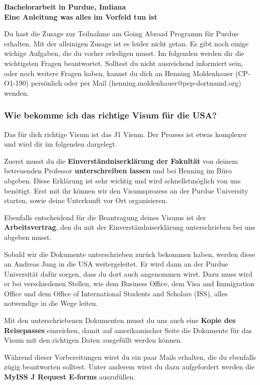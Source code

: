 \documentclass[
  paper=a4,
  fontsize=12pt,
  DIV=16,
  headheight=52pt,
  footheight=45pt,
  headinclude,
  parskip=full,
]{scrartcl}
\date{10. October 2017}
\begin{document}
\textbf{\Huge\sffamily Bachelorarbeit in Purdue, Indiana}\\[0.5\baselineskip]
\textbf{\Large\sffamily Eine Anleitung was alles im Vorfeld tun ist}

Du hast die Zusage zur Teilnahme am Going Abroad Programm für Purdue erhalten.
Mit der alleinigen Zusage ist es leider nicht getan.
Es gibt noch einige wichige Aufgaben, die du vorher erledigen musst.
Im folgenden werden dir die wichtigsten Fragen beantwortet.
Solltest du nicht ausreichend informiert sein, oder noch weitere Fragen haben,
kannst du dich an Henning Moldenhauer (CP-O1-190) persönlich oder per Mail
(henning.moldenhauer@pep-dortmund.org) wenden.

\subsubsection*{Wie bekomme ich das richtige Visum für die USA?}
Das für dich richtige Visum ist das J1 Visum.
Der Prozess ist etwas komplexer und wird dir im folgenden dargelegt.

Zuerst musst du die \textbf{Einverständniserklärung der Fakultät} von deinem
betreuenden Professor \textbf{unterschreiben lassen} und bei Henning im Büro
abgeben.
Diese Erklärung ist sehr wichtig und wird schnellstmöglich von uns benötigt.
Erst mit ihr können wir den Visumsprozess an der Purdue University starten, sowie
deine Unterkunft vor Ort organisieren.

Ebenfalls entscheidend für die Beantragung deines Visums ist der
\textbf{Arbeitsvertrag}, den du mit der Einverständniserklärung unterschrieben
bei uns abgeben musst.

Sobald wir die Dokumente unterschrieben zurück bekommen haben, werden diese an
Andreas Jung in die USA weitergeleitet.
Er wird dann an der Purdue Universität dafür sorgen, dass du dort auch angenommen
wirst. Dazu muss wird er bei verschiedenen Stellen, wie dem Business Office,
dem Visa and Immigration Office und dem Office of International Students and
Scholars (ISS), alles notwendige in die Wege leiten.

Mit den unterschriebenen Dokumenten musst du uns auch eine
\textbf{Kopie des Reisepasses} einreichen, damit auf amerikamischer Seite die
Dokumente für das Visum mit den richtigen Daten ausgefüllt werden können.

Während dieser Vorbereitungen wirst du ein paar Mails erhalten, die du
ebenfalls zügig beantworten solltest.
Unter anderem wirst du dazu aufgefordert werden die
\textbf{MyISS J Request E-forms} auszufüllen.
\end{document}
